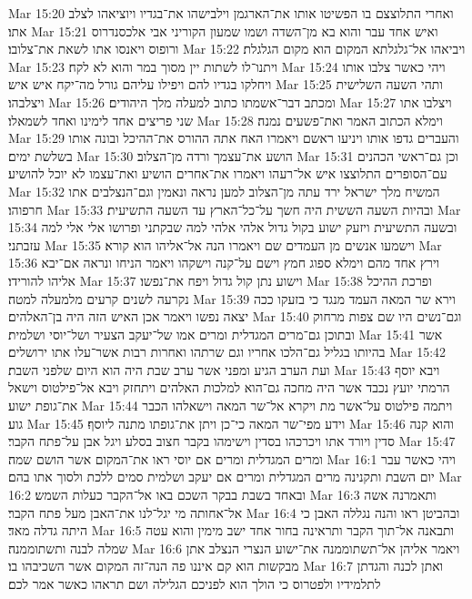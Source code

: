 Mar 15:20  ואחרי התלוצצם בו הפשיטו אותו את־הארגמן וילבישהו את־בגדיו ויוציאהו לצלב אתו׃
Mar 15:21  ואיש אחד עבר והוא בא מן־השדה ושמו שמעון הקוריני אבי אלכסנדרוס ורופוס ויאנסו אתו לשאת את־צלובו׃
Mar 15:22  ויביאהו אל־גלגלתא המקום הוא מקום הגלגלת׃
Mar 15:23  ויתנו־לו לשתות יין מסוך במר והוא לא לקח׃
Mar 15:24  ויהי כאשר צלבו אותו ויחלקו בגדיו להם ויפילו עליהם גורל מה־יקח איש איש׃
Mar 15:25  ותהי השעה השלישית ויצלבהו׃
Mar 15:26  ומכתב דבר־אשמתו כתוב למעלה מלך היהודים׃
Mar 15:27  ויצלבו אתו שני פריצים אחד לימינו ואחד לשמאלו׃
Mar 15:28  וימלא הכתוב האמר ואת־פשעים נמנה׃
Mar 15:29  והעברים גדפו אותו ויניעו ראשם ויאמרו האח אתה ההורס את־ההיכל ובונה אותו בשלשת ימים׃
Mar 15:30  הושע את־עצמך ורדה מן־הצלוב׃
Mar 15:31  וכן גם־ראשי הכהנים עם־הסופרים התלוצצו איש אל־רעהו ויאמרו את־אחרים הושיע ואת־עצמו לא יוכל להושיע׃
Mar 15:32  המשיח מלך ישראל ירד עתה מן־הצלוב למען נראה ונאמין וגם־הנצלבים אתו חרפוהו׃
Mar 15:33  ובהיות השעה הששית היה חשך על־כל־הארץ עד השעה התשיעית׃
Mar 15:34  ובשעה התשיעית ויזעק ישוע בקול גדול אלהי אלהי למה שבקתני ופרושו אלי אלי למה עזבתני׃
Mar 15:35  וישמעו אנשים מן העמדים שם ויאמרו הנה אל־אליהו הוא קורא׃
Mar 15:36  וירץ אחד מהם וימלא ספוג חמץ וישם על־קנה וישקהו ויאמר הניחו ונראה אם־יבא אליהו להורידו׃
Mar 15:37  וישוע נתן קול גדול ויפח את־נפשו׃
Mar 15:38  ופרכת ההיכל נקרעה לשנים קרעים מלמעלה למטה׃
Mar 15:39  וירא שר המאה העמד מנגד כי בזעקו ככה יצאה נפשו ויאמר אכן האיש הזה היה בן־האלהים׃
Mar 15:40  וגם־נשים היו שם צפות מרחוק ובתוכן גם־מרים המגדלית ומרים אמו של־יעקב הצעיר ושל־יוסי ושלמית׃
Mar 15:41  אשר בהיותו בגליל גם־הלכו אחריו וגם שרתהו ואחרות רבות אשר־עלו אתו ירושלים׃
Mar 15:42  ועת הערב הגיע ומפני אשר ערב שבת היה הוא היום שלפני השבת׃
Mar 15:43  ויבא יוסף הרמתי יועץ נכבד אשר היה מחכה גם־הוא למלכות האלהים ויתחזק ויבא אל־פילטוס וישאל את־גופת ישוע׃
Mar 15:44  ויתמה פילטוס על־אשר מת ויקרא אל־שר המאה וישאלהו הכבר גוע׃
Mar 15:45  וידע מפי־שר המאה כי־כן ויתן את־גופתו מתנה ליוסף׃
Mar 15:46  והוא קנה סדין ויורד אתו ויכרכהו בסדין וישימהו בקבר חצוב בסלע ויגל אבן על־פתח הקבר׃
Mar 15:47  ומרים המגדלית ומרים אם יוסי ראו את־המקום אשר הושם שמה׃
Mar 16:1  ויהי כאשר עבר יום השבת ותקנינה מרים המגדלית ומרים אם יעקב ושלמית סמים ללכת ולסוך אתו בהם׃
Mar 16:2  ובאחד בשבת בבקר השכם באו אל־הקבר כעלות השמש׃
Mar 16:3  ותאמרנה אשה אל־אחותה מי יגל־לנו את־האבן מעל פתח הקבר׃
Mar 16:4  ובהביטן ראו והנה נגללה האבן כי היתה גדלה מאד׃
Mar 16:5  ותבאנה אל־תוך הקבר ותראינה בחור אחד ישב מימין והוא עטה שמלה לבנה ותשתוממנה׃
Mar 16:6  ויאמר אליהן אל־תשתוממנה את־ישוע הנצרי הנצלב אתן מבקשות הוא קם איננו פה הנה־זה המקום אשר השכיבהו בו׃
Mar 16:7  ואתן לכנה והגדתן לתלמידיו ולפטרוס כי הולך הוא לפניכם הגלילה ושם תראהו כאשר אמר לכם׃
